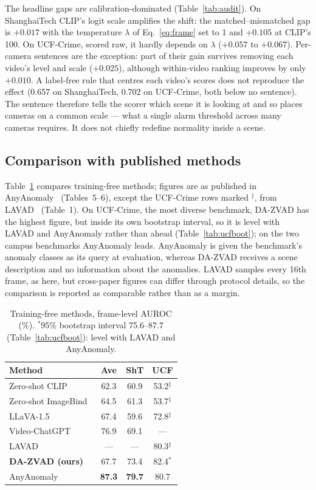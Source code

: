 \documentclass[conference]{IEEEtran}
\begin{document}
The headline gaps are calibration-dominated (Table~\ref{tab:audit}). On
ShanghaiTech CLIP's logit scale amplifies the shift: the matched--mismatched gap
is $+0.017$ with the temperature $\lambda$ of Eq.~\eqref{eq:frame} set to 1 and
$+0.105$ at CLIP's 100. On UCF-Crime, scored raw, it hardly depends on $\lambda$
($+0.057$ to $+0.067$). Per-camera sentences are the exception: part of their
gain survives removing each video's level and scale ($+0.025$), although
within-video ranking improves by only $+0.010$. A label-free rule that centres
each video's scores does not reproduce the effect (0.657 on ShanghaiTech, 0.702
on UCF-Crime, both below no sentence). The sentence therefore tells the scorer
which scene it is looking at and so places cameras on a common scale --- what a
single alarm threshold across many cameras requires. It does not chiefly
redefine normality inside a scene.

\subsection{Comparison with published methods}
Table~\ref{tab:sota} compares training-free methods; figures are as published
in AnyAnomaly~\cite{anyanomaly2025} (Tables~5--6), except the UCF-Crime rows
marked $^\ddagger$, from LAVAD~\cite{zanella2024lavad} (Table~1). On UCF-Crime,
the most diverse benchmark, DA-ZVAD has the highest figure, but inside its own
bootstrap interval, so it is level with LAVAD and AnyAnomaly rather than ahead
(Table~\ref{tab:ucfboot}); on the two campus benchmarks AnyAnomaly leads. AnyAnomaly is given the benchmark's anomaly classes
as its query at evaluation, whereas DA-ZVAD receives a scene description and no
information about the anomalies. LAVAD samples every 16th frame, as here, but
cross-paper figures can differ through protocol details, so the comparison is
reported as comparable rather than as a margin.

\begin{table}[t]
\caption{Training-free methods, frame-level AUROC (\%). $^\ast$95\% bootstrap
interval 75.6--87.7 (Table~\ref{tab:ucfboot}): level with LAVAD and AnyAnomaly.}
\label{tab:sota}
\centering\footnotesize
\setlength{\tabcolsep}{4pt}
\begin{tabular}{@{}lccc@{}}
\toprule
\textbf{Method} & \textbf{Ave} & \textbf{ShT} & \textbf{UCF} \\
\midrule
Zero-shot CLIP~\cite{radford2021clip} & 62.3 & 60.9 & 53.2$^\ddagger$ \\
Zero-shot ImageBind~\cite{girdhar2023imagebind} & 64.5 & 61.3 & 53.7$^\ddagger$ \\
LLaVA-1.5~\cite{liu2023llava} & 67.4 & 59.6 & 72.8$^\ddagger$ \\
Video-ChatGPT~\cite{maaz2024videochatgpt} & 76.9 & 69.1 & --- \\
LAVAD~\cite{zanella2024lavad} & --- & --- & 80.3$^\ddagger$ \\
\textbf{DA-ZVAD (ours)} & 67.7 & 73.4 & 82.4$^\ast$ \\
AnyAnomaly~\cite{anyanomaly2025} & \textbf{87.3} & \textbf{79.7} & 80.7 \\
\bottomrule
\end{tabular}
\end{table}
\end{document}
